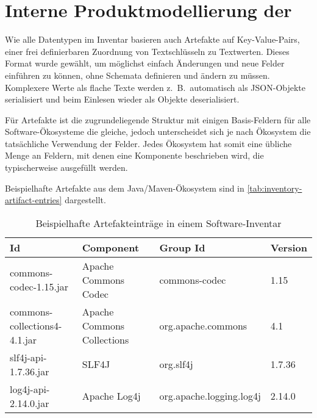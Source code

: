 \section{Interne Produktmodellierung der \metaeffektlg}\label{sec:metaeffekt-inventory-format}

Wie alle Datentypen im Inventar basieren auch Artefakte auf Key-Value-Pairs, einer frei definierbaren Zuordnung von Textschlüsseln zu Textwerten.
Dieses Format wurde gewählt, um möglichst einfach Änderungen und neue Felder einführen zu können, ohne Schemata definieren und ändern zu müssen.
Komplexere Werte als flache Texte werden z.\ B.\ automatisch als JSON-Objekte serialisiert und beim Einlesen wieder als Objekte deserialisiert.

Für Artefakte ist die zugrundeliegende Struktur mit einigen Basis-Feldern für alle Software-Ökosysteme die gleiche, jedoch unterscheidet sich je nach Ökosystem die tatsächliche Verwendung der Felder.
Jedes Ökosystem hat somit eine übliche Menge an Feldern, mit denen eine Komponente beschrieben wird, die typischerweise ausgefüllt werden.

Beispielhafte Artefakte aus dem Java/Maven-Ökosystem sind in \autoref{tab:inventory-artifact-entries} dargestellt.

\begin{table}[ht]
    \centering
    \begin{tabular}{llll}
        \toprule
        \textbf{Id}                  & \textbf{Component}         & \textbf{Group Id}        & \textbf{Version} \\
        \midrule
        commons-codec-1.15.jar       & Apache Commons Codec       & commons-codec            & 1.15             \\
        commons-collections4-4.1.jar & Apache Commons Collections & org.apache.commons       & 4.1              \\
        slf4j-api-1.7.36.jar         & SLF4J                      & org.slf4j                & 1.7.36           \\
        log4j-api-2.14.0.jar         & Apache Log4j               & org.apache.logging.log4j & 2.14.0           \\
        \bottomrule
    \end{tabular}
    \caption{Beispielhafte Artefakteinträge in einem Software-Inventar}
    \label{tab:inventory-artifact-entries}
\end{table}

